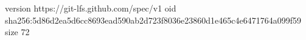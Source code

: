 version https://git-lfs.github.com/spec/v1
oid sha256:5d86d2ea5d6cc8693ead590ab2d723f8036e23860d1e465c4e6471764a099f59
size 72
